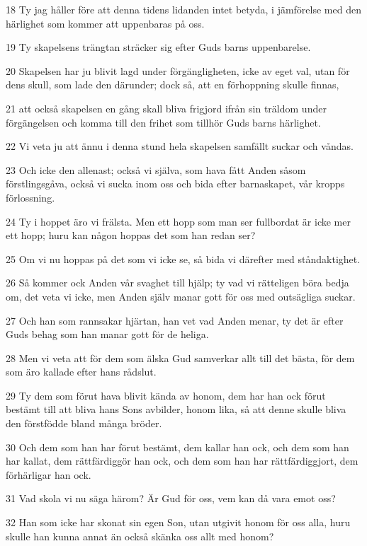 \par 18 Ty jag håller före att denna tidens lidanden intet betyda, i jämförelse med den härlighet som kommer att uppenbaras på oss.
\par 19 Ty skapelsens trängtan sträcker sig efter Guds barns uppenbarelse.
\par 20 Skapelsen har ju blivit lagd under förgängligheten, icke av eget val, utan för dens skull, som lade den därunder; dock så, att en förhoppning skulle finnas,
\par 21 att också skapelsen en gång skall bliva frigjord ifrån sin träldom under förgängelsen och komma till den frihet som tillhör Guds barns härlighet.
\par 22 Vi veta ju att ännu i denna stund hela skapelsen samfällt suckar och våndas.
\par 23 Och icke den allenast; också vi själva, som hava fått Anden såsom förstlingsgåva, också vi sucka inom oss och bida efter barnaskapet, vår kropps förlossning.
\par 24 Ty i hoppet äro vi frälsta. Men ett hopp som man ser fullbordat är icke mer ett hopp; huru kan någon hoppas det som han redan ser?
\par 25 Om vi nu hoppas på det som vi icke se, så bida vi därefter med ståndaktighet.
\par 26 Så kommer ock Anden vår svaghet till hjälp; ty vad vi rätteligen böra bedja om, det veta vi icke, men Anden själv manar gott för oss med outsägliga suckar.
\par 27 Och han som rannsakar hjärtan, han vet vad Anden menar, ty det är efter Guds behag som han manar gott för de heliga.
\par 28 Men vi veta att för dem som älska Gud samverkar allt till det bästa, för dem som äro kallade efter hans rådslut.
\par 29 Ty dem som förut hava blivit kända av honom, dem har han ock förut bestämt till att bliva hans Sons avbilder, honom lika, så att denne skulle bliva den förstfödde bland många bröder.
\par 30 Och dem som han har förut bestämt, dem kallar han ock, och dem som han har kallat, dem rättfärdiggör han ock, och dem som han har rättfärdiggjort, dem förhärligar han ock.
\par 31 Vad skola vi nu säga härom? Är Gud för oss, vem kan då vara emot oss?
\par 32 Han som icke har skonat sin egen Son, utan utgivit honom för oss alla, huru skulle han kunna annat än också skänka oss allt med honom?
